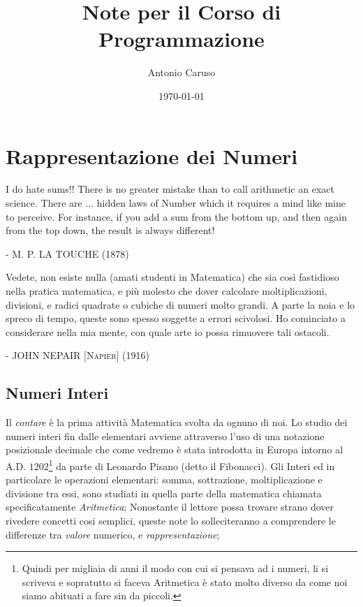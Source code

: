 \documentclass[a4paper]{book}
\title{Note per il Corso di Programmazione}
\author{Antonio Caruso}
\date{\today}
\makeatletter
\theoremstyle{definition}
\renewcommand\maketitle{
\begin{titlepage} \vspace*{\stretch{1}}
 \begin{center} {\Huge \@title \par}%
	 \vspace{5em}%
	 {\LARGE \@author \par}%
	 \vspace{1.5em} {
	 \large \emph{\@date} \par}%
	 \vspace{3em} \end{center}%
 \vspace*{\stretch{1}} 
\end{titlepage}}
\makeatother
\begin{document}
\frontmatter 
\maketitle 
\tableofcontents
{} 
\mainmatter

\chapter{Rappresentazione dei Numeri}

\epigraph{I do hate sums!! There is no greater mistake than to call arithmetic
an exact science. There are $\ldots$ hidden laws of Number which it requires a
mind like mine to perceive. For instance, if you add a sum from the bottom up,
and then again from the top down, the result is always different!}{ -
\textsc{M. P. LA TOUCHE} (1878)} 

\epigraph{Vedete, non esiste nulla (amati studenti in Matematica) che sia così
fastidioso nella pratica matematica, e più molesto che dover calcolare
moltiplicazioni, divisioni, e radici quadrate o cubiche di numeri molto grandi.
A parte la noia e lo spreco di tempo, queste sono spesso soggette a errori
scivolosi. Ho cominciato a considerare nella mia mente, con quale arte io possa
rimuovere tali ostacoli.} { - \textsc{JOHN NEPAIR [Napier] (1916)}}

\section[Numeri Interi]{Numeri Interi}

Il \emph{contare} è la prima attività Matematica svolta da ognuno di noi. Lo
studio dei numeri interi fin dalle elementari avviene attraverso l'uso di una
notazione posizionale decimale che come vedremo è stata introdotta in Europa
intorno al A.D. $1202$\footnote{Quindi per migliaia di anni il modo con cui si 
pensava ad i numeri, li si scriveva e sopratutto si faceva Aritmetica è stato molto diverso da come noi siamo abituati a fare sin da piccoli.} da parte di
Leonardo Pisano (detto il Fibonacci). Gli Interi ed in particolare le
operazioni elementari: somma, sottrazione, moltiplicazione e divisione tra
essi, sono studiati in quella parte della matematica chiamata specificatamente
\emph{Aritmetica}; Nonostante il lettore possa trovare strano dover rivedere
concetti cosi semplici, queste note lo solleciteranno a comprendere le
differenze tra \emph{valore} numerico, e \emph{rappresentazione};
\end{document}
